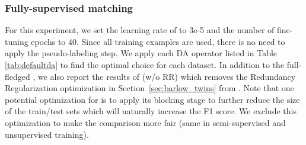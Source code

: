 \subsubsection{Fully-supervised matching}
\begin{table}[ht]
\vspace{-3mm}
	\small
	\caption{F1 scores for fully-supervised EM.}\label{tab:super}
\vspace{-2mm}
\end{table}

For this experiment, we set the learning rate of \system to 3e-5 and the number of fine-tuning epochs to 40.
Since all training examples are used, there is no need to apply the pseudo-labeling step.
We apply each DA operator listed in Table \ref{tab:defaultda} to find the optimal choice for each dataset. 
In addition to the full-fledged \system, we also report the results of \system (w/o \textsf{RR})
which removes the Redundancy Regularization optimization in Section~\ref{sec:barlow_twins} from \system.
Note that one potential optimization for \system is to
apply its blocking stage to further reduce the size of the train/test
sets which will naturally increase the F1 score. 
We exclude this optimization to make the comparison more fair
(same in semi-supervised and unsupervised training).

